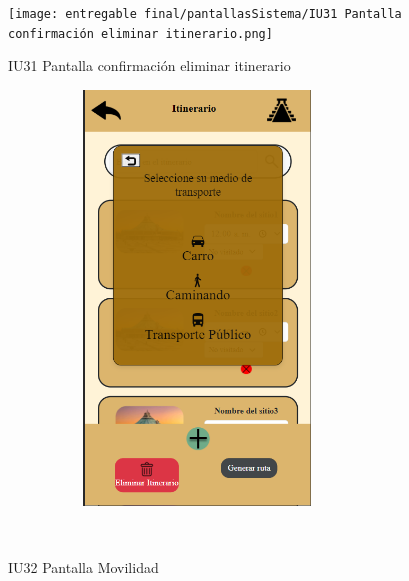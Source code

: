 \begin{figure}[htb]
    \begin{minipage}{1\textwidth}
    \centering
    \texttt{[image: entregable final/pantallasSistema/IU31 Pantalla confirmación eliminar itinerario.png]}
    \caption{IU31 Pantalla confirmación eliminar itinerario}
\end{minipage}

    \begin{minipage}{1\textwidth}
        \centering
        \includegraphics[width=10cm, height=11cm]{entregable final/pantallasSistema/IU32 Pantalla Movilidad.png}
        \caption{IU32 Pantalla Movilidad}
    \end{minipage}
    \\
\end{figure}
